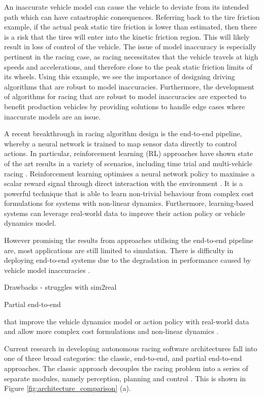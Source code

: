 An inaccurate vehicle model can cause the vehicle to deviate from its intended path which can have catastrophic consequences.
Referring back to the tire friction example, if the actual peak static tire friction is lower than estimated, then there is a risk that the tires will enter into the kinetic friction region.
This will likely result in loss of control of the vehicle.
The issue of model inaccuracy is especially pertinent in the racing case, as racing necessitates that the vehicle travels at high speeds and accelerations, and therefore close to the peak static friction limits of its wheels.
Using this example, we see the importance of designing driving algorithms that are robust to model inaccuracies.
Furthermore, the development of algorithms for racing that are robust to model inaccuracies are expected to benefit production vehicles by providing solutions to handle edge cases where inaccurate models are an issue.

A recent breakthrough in racing algorithm design is the end-to-end pipeline, whereby a neural network is trained to map sensor data directly to control actions.
In particular, reinforcement learning (RL) approaches have shown state of the art results in a variety of scenarios, including time trial and multi-vehicle racing \cite{Fuchs2021, Song2021}.
Reinforcement learning optimises a neural network policy to maximise a scalar reward signal through direct interaction with the environment \cite{Plaat_2022}.
It is a powerful technique that is able to learn non-trivial behaviour from complex cost formulations for systems with non-linear dynamics.  
Furthermore, learning-based systems can leverage real-world data to improve their action policy or vehicle dynamics model.

However promising the results from approaches utilising the end-to-end pipeline are, most applications are still limited to simulation.
There is difficulty in deploying end-to-end systems due to the degradation in performance caused by vehicle model inaccuracies \cite{Ivanov2020}.


Drawbacks - struggles with sim2real

Partial end-to-end


that improve the vehicle dynamics model or action policy with real-world data and allow more complex cost formulations and non-linear dynamics \cite{Fuchs2021}.


Current research in developing autonomous racing software architectures fall into one of three broad categories: the classic, end-to-end, and partial end-to-end approaches.
The classic approach decouples the racing problem into a series of separate modules, namely perception, planning and control \cite{Fuchs2021}.
This is shown in Figure \ref{fig:architecture_comparison} (a). 



